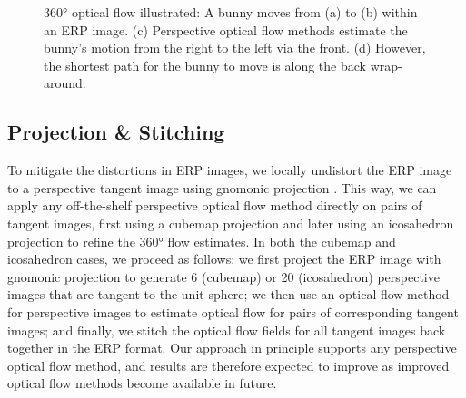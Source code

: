 \begin{figure}[hbt!]
	\centering
	\caption{\label{fig:app:warparound}%
		360° optical flow illustrated:
		A bunny moves from (a) to (b) within an ERP image.
		(c) Perspective optical flow methods estimate the bunny's motion from the right to the left via the front.
		(d) However, the shortest path for the bunny to move is along the back wrap-around.
	}
\end{figure}


\subsection{Projection \& Stitching}
\label{sec:approach:projstit}

To mitigate the distortions in ERP images, we locally undistort the ERP image to a perspective tangent image using gnomonic projection \cite{EderSLF2020}.
This way, we can apply any off-the-shelf perspective optical flow method directly on pairs of tangent images, first using a cubemap projection and later using an icosahedron projection to refine the 360° flow estimates.
In both the cubemap and icosahedron cases, we proceed as follows:
we first project the ERP image with gnomonic projection to generate 6 (cubemap) or 20 (icosahedron) perspective images that are tangent to the unit sphere;
we then use an optical flow method for perspective images to estimate optical flow for pairs of corresponding tangent images; and
finally, we stitch the optical flow fields for all tangent images back together in the ERP format.
Our approach in principle supports any perspective optical flow method, and results are therefore expected to improve as improved optical flow methods become available in future.

